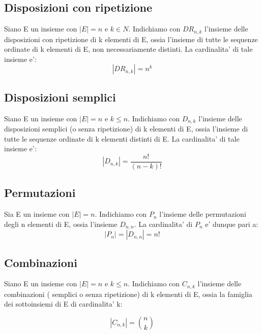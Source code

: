 \documentclass{article}
\begin{document}
\subsection{Disposizioni con ripetizione}
Siano E un insieme con $|E| = n$ e $k \in N$. Indichiamo con $DR_{n,k}$ l’insieme delle disposizioni con ripetizione di k elementi di E, ossia l’insieme di tutte le sequenze ordinate di k elementi di E, non
necessariamente distinti. La cardinalita' di tale insieme e':\newline
$$|DR_{n,k}| = n^k$$

\subsection{Disposizioni semplici}
Siano E un insieme con $|E| = n$ e $k \le n$. Indichiamo con $D_{n,k}$ l’insieme delle disposizioni semplici (o senza ripetizione) di k elementi di E, ossia l’insieme di tutte le sequenze ordinate di k elementi distinti di E. La cardinalita' di tale insieme e':\newline
$$ |D_{n,k}| = \frac{n!}{(n - k)!}$$

\subsection{Permutazioni}
Sia E un insieme con $|E| = n$. Indichiamo con $P_n$ l’insieme delle permutazioni degli n elementi di E, ossia l'insieme $D_{n,n}$. La cardinalita' di $P_n$ e' dunque pari a:\newline
$$|P_n|=|D_{n,n}|=n!$$

\subsection{Combinazioni}
Siano E un insieme con $|E| = n$ e $k \le n$. Indichiamo con $C_{n,k}$ l'insieme delle combinazioni ( semplici o senza ripetizione) di k elementi di E, ossia la famiglia dei sottoinsiemi di E di cardinalita' k:

$$|C_{n,k}| = {n\choose k}$$
\end{document}
